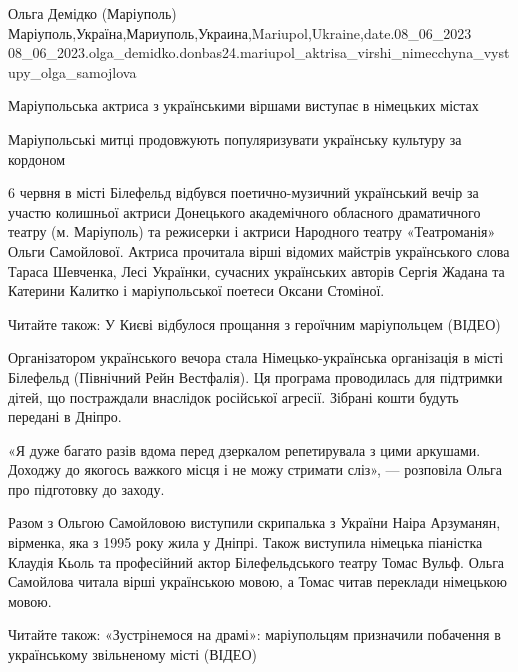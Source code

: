  
 
 
 
 

Ольга Демідко (Маріуполь)
Маріуполь,Україна,Мариуполь,Украина,Mariupol,Ukraine,date.08_06_2023
08_06_2023.olga_demidko.donbas24.mariupol_aktrisa_virshi_nimecchyna_vystupy_olga_samojlova

Маріупольська актриса з українськими віршами виступає в німецьких містах

Маріупольські митці продовжують популяризувати українську культуру за кордоном

6 червня в місті Білефельд відбувся поетично-музичний український вечір за
участю колишньої актриси Донецького академічного обласного драматичного театру
(м. Маріуполь) та режисерки і актриси Народного театру «Театроманія» Ольги
Самойлової. Актриса прочитала вірші відомих майстрів українського слова Тараса
Шевченка, Лесі Українки, сучасних українських авторів Сергія Жадана та Катерини
Калитко і маріупольської поетеси Оксани Стоміної.

Читайте також: У Києві відбулося прощання з героїчним маріупольцем (ВІДЕО)

Організатором українського вечора стала Німецько-українська організація в місті
Білефельд (Північний Рейн Вестфалія). Ця програма проводилась для підтримки
дітей, що постраждали внаслідок російської агресії. Зібрані кошти будуть
передані в Дніпро. 

«Я дуже багато разів вдома перед дзеркалом репетирувала з цими аркушами.
Доходжу до якогось важкого місця і не можу стримати сліз», — розповіла Ольга
про підготовку до заходу.

Разом з Ольгою Самойловою виступили скрипалька з України Наіра Арзуманян,
вірменка, яка з 1995 року жила у Дніпрі. Також виступила німецька піаністка
Клаудія Кьоль та професійний актор Білефельдського театру Томас Вульф. Ольга
Самойлова читала вірші українською мовою, а Томас читав переклади німецькою
мовою.

Читайте також: «Зустрінемося на драмі»: маріупольцям призначили побачення в
українському звільненому місті (ВІДЕО)

